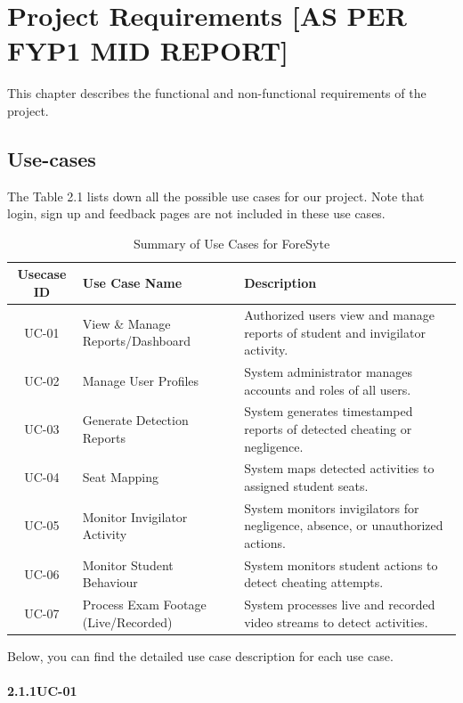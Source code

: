 \chapter{Project Requirements [AS PER FYP1 MID REPORT]}
This chapter describes the functional and non-functional requirements of the project. 
\section{Use-cases}
The Table 2.1 lists down all the possible use cases for our project. 
Note that login, sign up and feedback pages are not included in these use cases.
\begin{table}[htbp]
\caption{Summary of Use Cases for ForeSyte}
\centering
\begin{tabular}{|c|p{4cm}|p{8cm}|}
\hline
\textbf{Usecase ID} & \textbf{Use Case Name} & \textbf{Description} \\ \hline
UC-01 & View \& Manage Reports/Dashboard & Authorized users view and manage reports of student and invigilator activity. \\ \hline
UC-02 & Manage User Profiles & System administrator manages accounts and roles of all users. \\ \hline
UC-03 & Generate Detection Reports & System generates timestamped reports of detected cheating or negligence. \\ \hline
UC-04 & Seat Mapping & System maps detected activities to assigned student seats. \\ \hline
UC-05 & Monitor Invigilator Activity & System monitors invigilators for negligence, absence, or unauthorized actions. \\ \hline
UC-06 & Monitor Student Behaviour & System monitors student actions to detect cheating attempts. \\ \hline
UC-07 & Process Exam Footage (Live/Recorded) & System processes live and recorded video streams to detect activities. \\ \hline
\end{tabular}
\end{table}
\vspace{0.5cm} %

  Below, you can find the detailed use case description for each use case.
\clearpage

\subsubsection*{2.1.1\quad UC-01}

